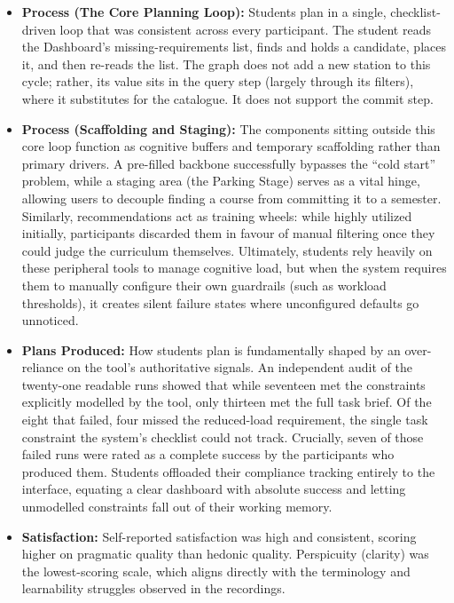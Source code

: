 \begin{itemize}
  \item \textbf{Process (The Core Planning Loop):} Students plan in a single, checklist-driven loop that was consistent across every participant. The student reads the Dashboard's missing-requirements list, finds and holds a candidate, places it, and then re-reads the list. The graph does not add a new station to this cycle; rather, its value sits in the query step (largely through its filters), where it substitutes for the catalogue. It does not support the commit step.

  \item \textbf{Process (Scaffolding and Staging):} The components sitting outside this core loop function as cognitive buffers and temporary scaffolding rather than primary drivers. A pre-filled backbone successfully bypasses the ``cold start'' problem, while a staging area (the Parking Stage) serves as a vital hinge, allowing users to decouple finding a course from committing it to a semester. Similarly, recommendations act as training wheels: while highly utilized initially, participants discarded them in favour of manual filtering once they could judge the curriculum themselves. Ultimately, students rely heavily on these peripheral tools to manage cognitive load, but when the system requires them to manually configure their own guardrails (such as workload thresholds), it creates silent failure states where unconfigured defaults go unnoticed. 

  \item \textbf{Plans Produced:} How students plan is fundamentally shaped by an over-reliance on the tool's authoritative signals. An independent audit of the twenty-one readable runs showed that while seventeen met the constraints explicitly modelled by the tool, only thirteen met the full task brief. Of the eight that failed, four missed the reduced-load requirement, the single task constraint the system's checklist could not track. Crucially, seven of those failed runs were rated as a complete success by the participants who produced them. Students offloaded their compliance tracking entirely to the interface, equating a clear dashboard with absolute success and letting unmodelled constraints fall out of their working memory.

  \item \textbf{Satisfaction:} Self-reported satisfaction was high and consistent, scoring higher on pragmatic quality than hedonic quality. Perspicuity (clarity) was the lowest-scoring scale, which aligns directly with the terminology and learnability struggles observed in the recordings.
\end{itemize}

